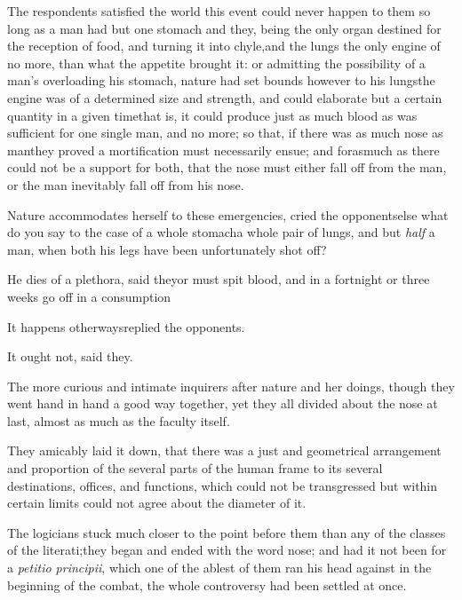 \documentclass{article}
\begin{document}
The respondents satisfied the world this event could never
happen to them so long as a man had but one stomach and
they, being the
only organ destined for the reception of food, and turning
it into chyle,\tsk and the lungs the only engine of
no more, than
what the appetite brought it: or admitting the possibility
of a man’s overloading his stomach, nature had set bounds
however to his lungs\tsk the engine was of a determined size
and strength, and could elaborate but a certain quantity in
a given time\tsk that is, it could produce just as much
blood as was sufficient for one single man, and no more; so
that, if there was as much nose as man\tsk they proved a
mortification must necessarily ensue; and forasmuch as there
could not be a support for both, that the nose must either
fall off from the man, or the man inevitably fall off from
his nose.

Nature accommodates herself to these emergencies, cried the
opponents\tsk else what do you say to the case of a whole
stomach\tsk a whole pair of lungs, and but \textit{half} a man, when both
his legs have been unfortunately shot off?\tsk

He dies of a plethora, said they\tsk or must spit blood, and
in a fortnight or three weeks go off in a
consumption\tsk

\tsh It happens otherways\tsk replied the
opponents.\tsh

It ought not, said they.

The more curious and intimate inquirers after nature and her
doings, though they went hand in hand a good way together,
yet they all divided about the nose at last, almost as much
as the faculty itself.

They amicably laid it down, that there was a just and
geometrical arrangement and proportion of the several parts of the
human frame to its several destinations, offices, and functions,
which could not be transgressed but within certain
limits\break
{}
could not agree about the diameter of it.

The logicians stuck much closer to the point before them than
any of the classes of the literati;\tsh they began and
ended with the word nose; and had it not been for a \textit{petitio
principii}, which one of the ablest of them ran his head against
in the beginning of the combat, the whole controversy had been
settled at once.
\end{document}
